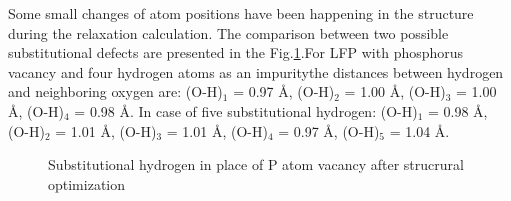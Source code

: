 Some small changes of atom positions have been happening in the structure during the relaxation calculation. The comparison between two possible substitutional defects are presented in the Fig.\ref{ris:P45H}.For LFP with phosphorus vacancy and four hydrogen atoms as an impuritythe distances between hydrogen and neighboring oxygen are: (O-H)$_{1}$ = 0.97 \AA, (O-H)$_{2}$ = 1.00 \AA, (O-H)$_{3}$ = 1.00 \AA, (O-H)$_{4}$ = 0.98 \AA. In case of five substitutional hydrogen: (O-H)$_{1}$ = 0.98 \AA, (O-H)$_{2}$ = 1.01 \AA, (O-H)$_{3}$ = 1.01 \AA, (O-H)$_{4}$ = 0.97 \AA, (O-H)$_{5}$ = 1.04 \AA.


\begin{figure}[h]
\begin{minipage}[h]{0.49\linewidth}
\end{minipage}
\hfill
\begin{minipage}[h]{0.49\linewidth}
\end{minipage}
\caption{Substitutional hydrogen in place of P atom vacancy after strucrural optimization}
\label{ris:P45H}
\end{figure}
